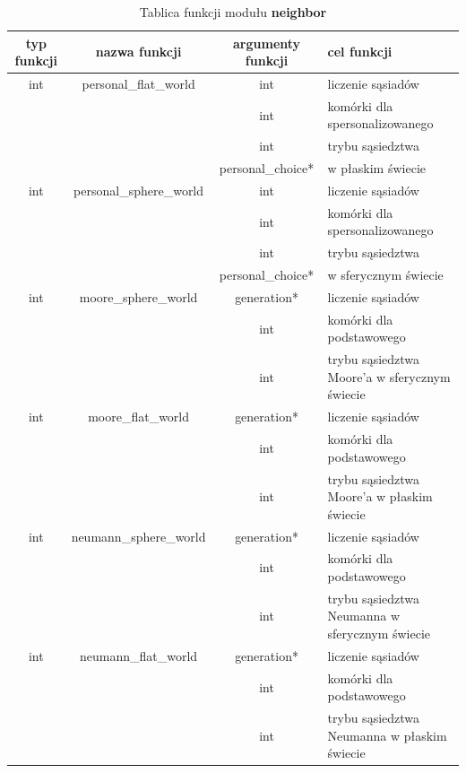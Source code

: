 \documentclass[a4paper]{article}
\begin{document}
\newpage


\begin{table}[h!]
	\centering
	\caption{\label{table:Tabela7}Tablica funkcji modu\l{}u \textbf{neighbor}}
        \begin{tabular}{| c | c | c | p{3cm}  |}
                \hline
                typ funkcji & nazwa funkcji & argumenty funkcji & cel funkcji \\ \hline \hline

                int & personal\_flat\_world & int & liczenie s\k{a}siad\'ow \\
                & & int & kom\'orki dla spersonalizowanego \\
                & & int & trybu s\k{a}siedztwa \\
                & & personal\_choice* & w p\l{}askim \'swiecie \\ \hline

                int & personal\_sphere\_world & int & liczenie s\k{a}siad\'ow \\
                & & int & kom\'orki dla spersonalizowanego \\
                & & int & trybu s\k{a}siedztwa \\
                & & personal\_choice* & w sferycznym \'swiecie \\ \hline

                int & moore\_sphere\_world & generation* & liczenie s\k{a}siad\'ow \\
                & & int & kom\'orki dla podstawowego \\
                & & int & trybu s\k{a}siedztwa Moore'a w sferycznym \'swiecie \\ \hline

                int & moore\_flat\_world & generation* & liczenie s\k{a}siad\'ow \\
                & & int & kom\'orki dla podstawowego \\
                & & int & trybu s\k{a}siedztwa Moore'a w p\l{}askim \'swiecie \\ \hline

                int & neumann\_sphere\_world & generation* & liczenie s\k{a}siad\'ow \\
                & & int & kom\'orki dla podstawowego \\
                & & int & trybu s\k{a}siedztwa Neumanna w sferycznym \'swiecie \\ \hline

                int & neumann\_flat\_world & generation* & liczenie s\k{a}siad\'ow \\
                & & int & kom\'orki dla podstawowego \\
                & & int & trybu s\k{a}siedztwa Neumanna w p\l{}askim \'swiecie \\ \hline

        \end{tabular}
\end{table}
\end{document}
